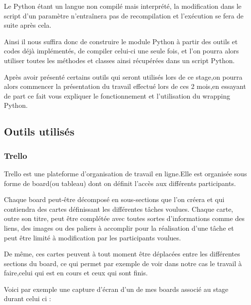 \documentclass[french,12pt]{article}
\begin{document}
Le Python étant un langue non compilé mais interprété, la modification dans le script d'un paramètre n'entraînera pas de recompilation et l'exécution se fera de suite après cela.
\newline

Ainsi il nous suffira donc de construire le module Python à partir des outils et codes déjà implémentés, de compiler celui-ci une seule fois, et l'on pourra alors utiliser toutes les méthodes et classes ainsi récupérées dans un script Python.
\newline

Après avoir présenté certains outils qui seront utilisés lors de ce stage,on pourra alors commencer la présentation du travail effectué lors de ces 2 mois,en essayant de part ce fait vous expliquer le fonctionnement et l'utilisation du wrapping Python.

\subsection{Outils utilisés}

\subsubsection{Trello}

Trello est une plateforme d'organisation de travail en ligne.Elle est organisée sous forme de board(ou tableau) dont on définit l'accès aux différents participants.
\newline

Chaque board peut-être décomposé en sous-sections que l'on créera et qui contiendra des cartes définissant les différentes tâches voulues.
Chaque carte, outre son titre, peut être complétée avec toutes sortes d'informations comme des liens, des images ou des paliers à accomplir pour la réalisation d'une tâche et peut être limité à modification par les participants voulues.
\newline

De même, ces cartes peuvent à tout moment être déplacées entre les différentes sections du board, ce qui permet par exemple de voir dans notre cas le travail à faire,celui qui est en cours et ceux qui sont finis.
\newline

Voici par exemple une capture d'écran d'un de mes boards associé au stage durant celui ci :
\end{document}
